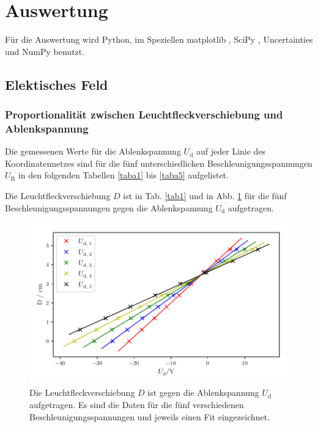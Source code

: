 \section{Auswertung}
\label{sec:Auswertung}

Für die Auswertung wird Python, im Speziellen matplotlib \cite{matplotlib}, 
SciPy \cite{scipy}, Uncertainties \cite{uncertainties}
und NumPy \cite{numpy} benutzt.

\subsection{Elektisches Feld}
\subsubsection{Proportionalität zwischen Leuchtfleckverschiebung und Ablenkspannung}
\label{sec:prop}
Die gemessenen Werte für die Ablenkspannung $U_\text{d}$
auf jeder Linie des Koordinatennetzes sind für die fünf
unterschiedlichen Beschleunigungsspannungen $U_\text{B}$
in den folgenden Tabellen \ref{taba1} bis \ref{taba5} aufgelistet.






\noindent Die Leuchtfleckverschiebung $D$ ist in Tab. \ref{tab1} und in Abb. \ref{fig:plot1}
für die fünf Beschleunigungsspannungen gegen die Ablenkspannung $U_\text{d}$ aufgetragen.



\begin{figure}
    \centering
    \includegraphics[width=12cm, height=7cm]{build/plot1.pdf}
    \caption{Die Leuchtfleckverschiebung $D$ ist gegen die Ablenkspannung $U_\text{d}$ aufgetragen. Es sind die Daten
    für die fünf verschiedenen Beschleunigungsspannungen und
    jeweils einen Fit eingezeichnet.}
    \label{fig:plot1}
\end{figure}


